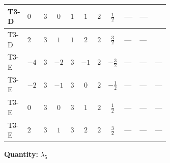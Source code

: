 \documentclass[8pt]{article}
\begin{document}
\begin{landscape}
\begin{longtable}{@{}llcccccc >{\raggedright\arraybackslash}p{0.21\linewidth} >{\raggedright\arraybackslash}p{0.21\linewidth} >{\raggedright\arraybackslash}p{0.21\linewidth}@{}}
\midrule
T3-D & $0$ & $3$ & $0$ & $1$ & $1$ & $2$ & $\frac{1}{2}$ & --- & --- & \scriptsize\adjustbox{max width=\linewidth}{$\begin{gathered} {\lambda_5} (T_{\nu}^{(1)}+2 T_{\nu}^{(2)}+6 \operatorname{Tr}\!\left({Y_d}\,\left({Y_d}\right)^{\dagger}\right)+2 \operatorname{Tr}\!\left({Y_e}\,\left({Y_e}\right)^{\dagger}\right)+6 \operatorname{Tr}\!\left({Y_u}\,\left({Y_u}\right)^{\dagger}\right)-4 {\lambda_{HS_1}^{(A)}})\end{gathered}$} \\
\midrule
T3-D & $2$ & $3$ & $1$ & $1$ & $2$ & $2$ & $\frac{3}{2}$ & --- & --- & \scriptsize\adjustbox{max width=\linewidth}{$\begin{gathered} {\lambda_5} (T_{\nu}^{(1)}+2 T_{\nu}^{(2)}+6 \operatorname{Tr}\!\left({Y_d}\,\left({Y_d}\right)^{\dagger}\right)+2 \operatorname{Tr}\!\left({Y_e}\,\left({Y_e}\right)^{\dagger}\right)+6 \operatorname{Tr}\!\left({Y_u}\,\left({Y_u}\right)^{\dagger}\right)-4 {\lambda_{HS_1}^{(A)}})\end{gathered}$} \\
\midrule
T3-E & $-4$ & $3$ & $-2$ & $3$ & $-1$ & $2$ & $-\frac{3}{2}$ & --- & --- & --- \\
\midrule
T3-E & $-2$ & $3$ & $-1$ & $3$ & $0$ & $2$ & $-\frac{1}{2}$ & --- & --- & --- \\
\midrule
T3-E & $0$ & $3$ & $0$ & $3$ & $1$ & $2$ & $\frac{1}{2}$ & --- & --- & --- \\
\midrule
T3-E & $2$ & $3$ & $1$ & $3$ & $2$ & $2$ & $\frac{3}{2}$ & --- & --- & --- \\
\midrule
\bottomrule
\end{longtable}
\clearpage
\noindent\textbf{Quantity: }$\lambda_5$\par\smallskip

\end{landscape}
\end{document}
